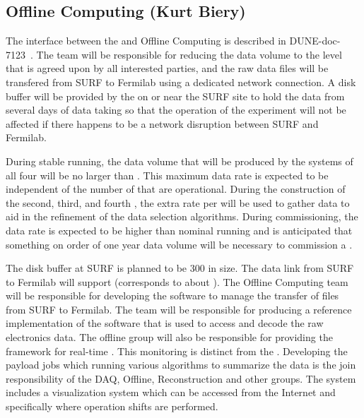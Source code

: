 \subsection{Offline Computing (Kurt Biery)}
\label{sec:fd-daq-intfc-fnal-cmptg}

The interface between the  and Offline Computing is
described in DUNE-doc-7123~\cite{docdb-7123}.
The  team will be responsible for reducing the data volume
to the level that is agreed upon by all interested parties, and the
raw data files will be transfered from SURF to Fermilab using a
dedicated network connection.
A disk buffer will be provided by the  on or near the SURF
site to hold the data from several days of data taking so that the
operation of the experiment will not be affected if there happens to
be a network disruption between SURF and Fermilab.

During stable running, the data volume that will be produced by the
 systems of all four  will be no larger
than \offsitepbpy.
This maximum data rate is expected to be independent of the number of
 that are operational.
During the construction of the second, third, and fourth
, the extra rate per  will be used
to gather data to aid in the refinement of the data selection
algorithms.
During commissioning, the data rate is expected to be higher than
nominal running and is anticipated that something on order of one year
data volume will be necessary to commission a .

The disk buffer at SURF is planned to be \SI{300}{\TB} in size.
The data link from SURF to Fermilab will support \surffnalbw
(\offsitepbpy corresponds to about \offsitegbps).
The Offline Computing team will be responsible for developing the
software to manage the transfer of files from SURF to Fermilab.
The  team will be responsible for producing a reference
implementation of the software that is used to access and decode the
raw electronics data.
The offline group will also be responsible for providing the framework
for real-time . 
This monitoring is distinct from the .
Developing the payload jobs which running various algorithms to
summarize the data is the join responsibility of the DAQ, Offline,
Reconstruction and other groups.
The  system includes a visualization system which can be
accessed from the Internet and specifically where operation shifts are
performed.

